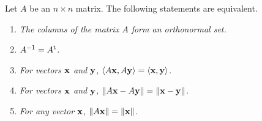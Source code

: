  
\begin{theorem}
Let $A$ be an $n \times n$ matrix.  The following statements are
equivalent. 
\begin{enumerate}
 
\rm \item \it
The columns of the matrix $A$ form an orthonormal set.
 
\rm \item \it
$A^{-1} = A^{\rm t}$.
 
\rm \item \it
For vectors ${\bold x}$ and ${\bold y}$, $\langle  A{\bold x}, A
{\bold y} \rangle = \langle  {\bold x}, {\bold y} \rangle$.
 
\rm \item \it
For vectors ${\bold x}$ and ${\bold y}$, $\| A{\bold x}- A{\bold y} \|
=\| {\bold x}- {\bold y} \|$. 
 
\rm \item \it
For any vector ${\bold x}$, $\| A{\bold x} \| = \| {\bold x}\|$.
 
\end{enumerate}
\end{theorem}
 
